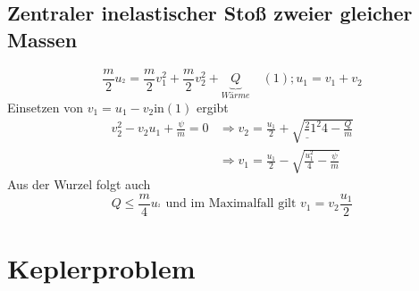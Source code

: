 \documentclass[11pt]{article}
\begin{document}
					\subsection{Zentraler inelastischer Stoß zweier gleicher Massen}
					\[ \frac{m}{2} u_^2 = \frac{m}{2} v_1^2 + \frac{m}{2} v_2^2 + \underbrace{Q}_{Wärme} \quad  (1); u_1 = v_1+ v_2  \]
					Einsetzen von $ v_1 = u_1 - v_2 $in$ (1) $ ergibt
					\begin{align*}
					v_2^2 - v_2 u_1 + \frac{\psi}{m} = 0 &\Rightarrow v_2 = \frac{u_1}{2} + \sqrt{\frac{2}_1^2{4 } - \frac{Q}{m}}\\
					&\Rightarrow v_1 = \frac{u_1}{2} - \sqrt{\frac{u_1^2}{4} - \frac{\psi}{m}}
					\end{align*}
					Aus der Wurzel folgt auch
					\[ Q \leq \frac{m}{4} u_^^2  \text{ und im Maximalfall gilt } v_1 = v_2 \frac{u_1}{2} \]
						\section{Keplerproblem}
\end{document}

